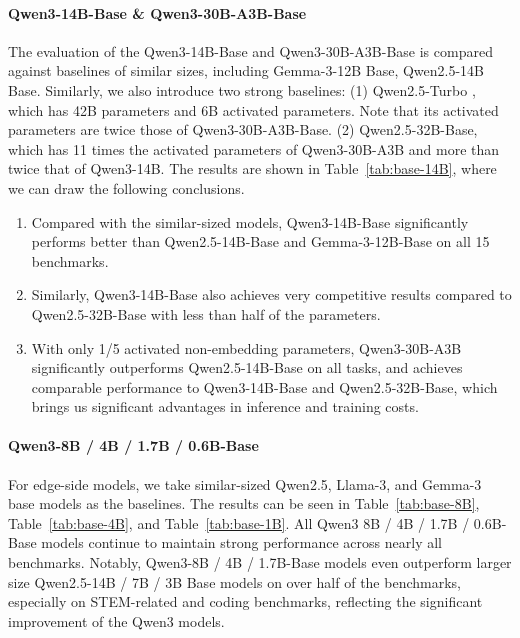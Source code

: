 \paragraph{Qwen3-14B-Base \& Qwen3-30B-A3B-Base}
The evaluation of the Qwen3-14B-Base and Qwen3-30B-A3B-Base is compared against baselines of similar sizes, including Gemma-3-12B Base, Qwen2.5-14B Base. Similarly, we also introduce two strong baselines: (1) Qwen2.5-Turbo \citep{qwen2.5}, which has 42B parameters and 6B activated parameters. Note that its activated parameters are twice those of Qwen3-30B-A3B-Base. (2) Qwen2.5-32B-Base, which has 11 times the activated parameters of Qwen3-30B-A3B and more than twice that of Qwen3-14B.
The results are shown in Table~\ref{tab:base-14B}, where we can draw the following conclusions.
\begin{enumerate}[label=(\arabic*)]
\item Compared with the similar-sized models, Qwen3-14B-Base significantly performs better than Qwen2.5-14B-Base and Gemma-3-12B-Base on all 15 benchmarks. 
\item Similarly, Qwen3-14B-Base also achieves very competitive results compared to Qwen2.5-32B-Base with less than half of the parameters.
\item With only 1/5 activated non-embedding parameters, Qwen3-30B-A3B significantly outperforms Qwen2.5-14B-Base on all tasks, and achieves comparable performance to Qwen3-14B-Base and Qwen2.5-32B-Base, which brings us significant advantages in inference and training costs.
\end{enumerate}



\paragraph{Qwen3-8B / 4B / 1.7B / 0.6B-Base}
For edge-side models, we take similar-sized Qwen2.5, Llama-3, and Gemma-3 base models as the baselines. The results can be seen in Table~\ref{tab:base-8B}, Table~\ref{tab:base-4B}, and Table~\ref{tab:base-1B}. All Qwen3 8B / 4B / 1.7B / 0.6B-Base models continue to maintain strong performance across nearly all benchmarks. Notably, Qwen3-8B / 4B / 1.7B-Base models even outperform larger size Qwen2.5-14B / 7B / 3B Base models on over half of the benchmarks, especially on STEM-related and coding benchmarks, reflecting the significant improvement of the Qwen3 models.

